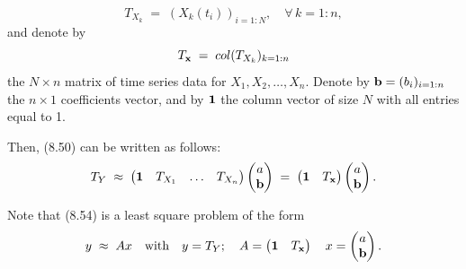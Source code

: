 
\begin{equation}
T_{X_k} \;=\; (X_k(t_i))_{i=1:N}, \quad \forall\, k = 1:n,
\end{equation}
and denote by
\begin{equation}
T_{\mathbf{x}} \;=\; col(T_{X_k})_{k=1:n}
\end{equation}
the $N \times n$ matrix of time series data for $X_1, X_2, \ldots, X_n$. Denote by
$\mathbf{b} = (b_i)_{i=1:n}$ the $n \times 1$ coefficients vector, and by $\mathbf{1}$ the column
vector of size $N$ with all entries equal to 1.

Then, (8.50) can be written as follows:
\begin{equation}
T_Y \;\approx\; \begin{pmatrix} \mathbf{1} & T_{X_1} & \dots & T_{X_n} \end{pmatrix}
\begin{pmatrix} a \\ \mathbf{b} \end{pmatrix}
\;=\;
\begin{pmatrix} \mathbf{1} & T_{\mathbf{x}} \end{pmatrix}
\begin{pmatrix} a \\ \mathbf{b} \end{pmatrix}.
\end{equation}

Note that (8.54) is a least square problem of the form
\begin{equation}
y \;\approx\; Ax \quad \text{with} \quad y = T_Y; \quad A = \begin{pmatrix} \mathbf{1} &
T_{\mathbf{x}} \end{pmatrix} \quad x = \begin{pmatrix} a \\ \mathbf{b} \end{pmatrix}.
\end{equation}

